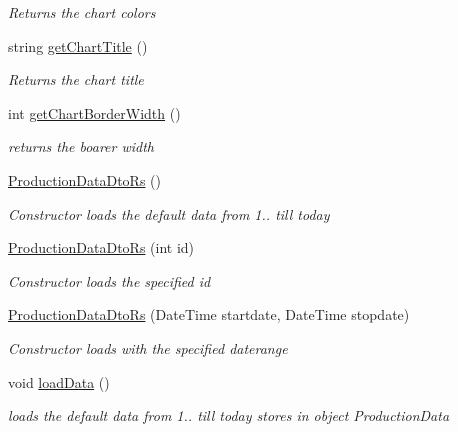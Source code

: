 \begin{DoxyCompactItemize}
\begin{DoxyCompactList}\small\item\em Returns the chart colors \end{DoxyCompactList}\item 
string \hyperlink{classkpi_mvc_api_1_1_data_transfer_objects_1_1_production_data_dto_rs_aafbcb529de90cca6265eb5c3302e3bd0}{get\+Chart\+Title} ()
\begin{DoxyCompactList}\small\item\em Returns the chart title \end{DoxyCompactList}\item 
int \hyperlink{classkpi_mvc_api_1_1_data_transfer_objects_1_1_production_data_dto_rs_ab2c12e10d53b8ef8e467ed92313eed82}{get\+Chart\+Border\+Width} ()
\begin{DoxyCompactList}\small\item\em returns the boarer width \end{DoxyCompactList}\item 
\hyperlink{classkpi_mvc_api_1_1_data_transfer_objects_1_1_production_data_dto_rs_a958f90d329c37714b754b3db8bf94e02}{Production\+Data\+Dto\+Rs} ()
\begin{DoxyCompactList}\small\item\em Constructor loads the default data from 1.. till today \end{DoxyCompactList}\item 
\hyperlink{classkpi_mvc_api_1_1_data_transfer_objects_1_1_production_data_dto_rs_af322603913a41645237ffe3d7060cf51}{Production\+Data\+Dto\+Rs} (int id)
\begin{DoxyCompactList}\small\item\em Constructor loads the specified id \end{DoxyCompactList}\item 
\hyperlink{classkpi_mvc_api_1_1_data_transfer_objects_1_1_production_data_dto_rs_a1694f3f486bf07ce79efd887f9086d63}{Production\+Data\+Dto\+Rs} (Date\+Time startdate, Date\+Time stopdate)
\begin{DoxyCompactList}\small\item\em Constructor loads with the specified daterange \end{DoxyCompactList}\item 
void \hyperlink{classkpi_mvc_api_1_1_data_transfer_objects_1_1_production_data_dto_rs_a58fd92fa5a7191f03f2e0942afaaa65d}{load\+Data} ()
\begin{DoxyCompactList}\small\item\em loads the default data from 1.. till today stores in object {\ttfamily Production\+Data} \end{DoxyCompactList}\item 

\end{DoxyCompactItemize}
